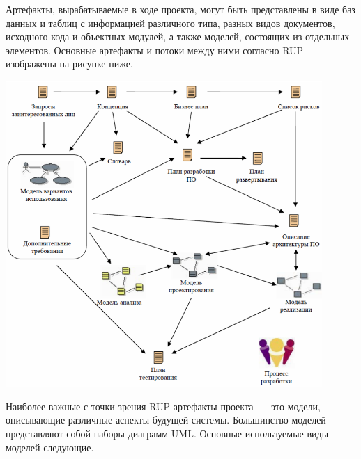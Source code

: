 \documentclass{../../text-style}
\begin{document}
Артефакты, вырабатываемые в ходе проекта, могут быть представлены в виде баз данных и таблиц с информацией различного типа, разных видов документов, исходного кода и объектных модулей, а также моделей, состоящих из отдельных элементов. Основные артефакты и потоки между ними согласно RUP изображены на рисунке ниже.

\begin{center}
    \includegraphics[width=0.9\textwidth]{rupArtefacts.png}
\end{center}

Наиболее важные с точки зрения RUP артефакты проекта~--- это модели, описывающие различные аспекты будущей системы. Большинство моделей представляют собой наборы диаграмм UML. Основные используемые виды моделей следующие.
\end{document}
